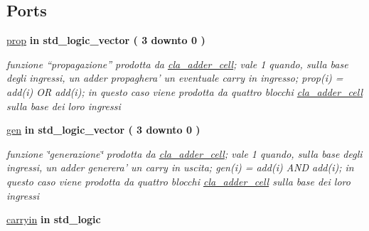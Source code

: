 \subsection*{Ports}
 \begin{DoxyCompactItemize}
\item 
\hyperlink{group___carry_network_gac1f84cd3374a5a4d2ee2669ebdadafe8}{prop}  {\bfseries {\bfseries \textcolor{vhdlchar}{in}\textcolor{vhdlchar}{ }}} {\bfseries \textcolor{vhdlchar}{std\+\_\+logic\+\_\+vector}\textcolor{vhdlchar}{ }\textcolor{vhdlchar}{(}\textcolor{vhdlchar}{ }\textcolor{vhdlchar}{ } \textcolor{vhdldigit}{3} \textcolor{vhdlchar}{ }\textcolor{vhdlchar}{downto}\textcolor{vhdlchar}{ }\textcolor{vhdlchar}{ } \textcolor{vhdldigit}{0} \textcolor{vhdlchar}{ }\textcolor{vhdlchar}{)}\textcolor{vhdlchar}{ }} 
\begin{DoxyCompactList}\small\item\em funzione “propagazione” prodotta da \hyperlink{classcla__adder__cell}{cla\+\_\+adder\+\_\+cell}; vale 1 quando, sulla base degli ingressi, un adder propaghera' un eventuale carry in ingresso; prop(i) = add(i) O\+R add(i); in questo caso viene prodotta da quattro blocchi \hyperlink{classcla__adder__cell}{cla\+\_\+adder\+\_\+cell} sulla base dei loro ingressi \end{DoxyCompactList}\item 
\hyperlink{group___carry_network_ga1ff97daaf4e03defc21748593cacfaa7}{gen}  {\bfseries {\bfseries \textcolor{vhdlchar}{in}\textcolor{vhdlchar}{ }}} {\bfseries \textcolor{vhdlchar}{std\+\_\+logic\+\_\+vector}\textcolor{vhdlchar}{ }\textcolor{vhdlchar}{(}\textcolor{vhdlchar}{ }\textcolor{vhdlchar}{ } \textcolor{vhdldigit}{3} \textcolor{vhdlchar}{ }\textcolor{vhdlchar}{downto}\textcolor{vhdlchar}{ }\textcolor{vhdlchar}{ } \textcolor{vhdldigit}{0} \textcolor{vhdlchar}{ }\textcolor{vhdlchar}{)}\textcolor{vhdlchar}{ }} 
\begin{DoxyCompactList}\small\item\em funzione \char`\"{}generazione\char`\"{} prodotta da \hyperlink{classcla__adder__cell}{cla\+\_\+adder\+\_\+cell}; vale 1 quando, sulla base degli ingressi, un adder generera' un carry in uscita; gen(i) = add(i) A\+N\+D add(i); in questo caso viene prodotta da quattro blocchi \hyperlink{classcla__adder__cell}{cla\+\_\+adder\+\_\+cell} sulla base dei loro ingressi \end{DoxyCompactList}\item 
\hyperlink{group___carry_network_gaa556a73dc4a4de1a0d662b25adbcbe33}{carryin}  {\bfseries {\bfseries \textcolor{vhdlchar}{in}\textcolor{vhdlchar}{ }}} {\bfseries \textcolor{vhdlchar}{std\+\_\+logic}\textcolor{vhdlchar}{ }} 

\end{DoxyCompactItemize}

